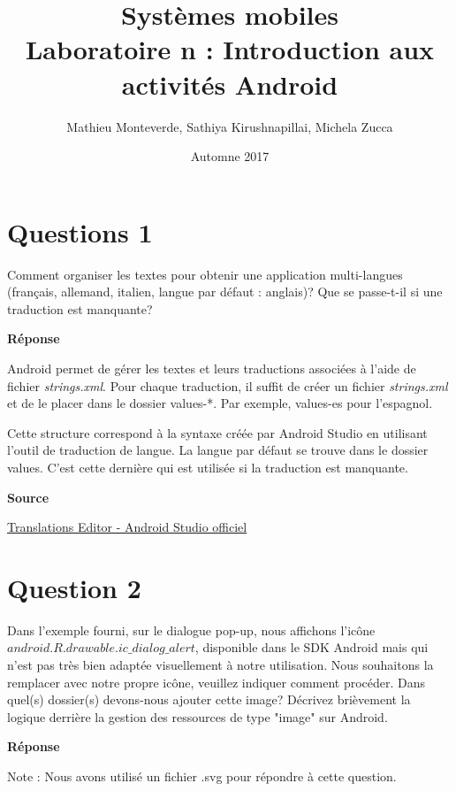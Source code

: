 \documentclass[francais,12pt]{article}
\title{Systèmes mobiles \\ Laboratoire n\textordmasculine1 : Introduction aux activités Android}
\author{Mathieu Monteverde, Sathiya Kirushnapillai, Michela Zucca}
\date{Automne 2017}
\begin{document}
	\maketitle
    
    \setlength{\parskip}{1em}
    
    \section*{Questions 1}

        Comment organiser les textes pour obtenir une application multi-langues (français, allemand, italien, langue par défaut : anglais)? Que se passe-t-il si une traduction est manquante? \par
        
        {\color[rgb]{0,0.5,0.23}\textbf{Réponse}}
        
        Android permet de gérer les textes et leurs traductions associées à l'aide de fichier \textit{strings.xml}. Pour chaque traduction, il suffit de créer un fichier \textit{strings.xml} et de le placer dans le dossier values-*. Par exemple, values-es pour l'espagnol.\par

        Cette structure correspond à la syntaxe créée par Android Studio en utilisant l'outil de traduction de langue. La langue par défaut se trouve dans le dossier values. C'est cette dernière qui est utilisée si la traduction est manquante.
        
        \textbf{Source}
        
        
        \href{https://developer.android.com/studio/write/translations-editor.html}{Translations Editor - Android Studio officiel}
        

	\section*{Question 2}
		Dans l'exemple fourni, sur le dialogue pop-up, nous affichons l'icône $android.R.drawable.ic\_dialog\_alert$, disponible dans le SDK Android mais qui n'est pas très bien adaptée visuellement à notre utilisation. Nous souhaitons la remplacer avec notre propre icône, veuillez indiquer comment procéder. Dans quel(s) dossier(s) devons-nous ajouter cette image? Décrivez brièvement la logique derrière la gestion des ressources de type "image" sur Android. 
		
		{\color[rgb]{0,0.5,0.23}\textbf{Réponse}}
		
		Note : Nous avons utilisé un fichier .svg pour répondre à cette question.
		
\end{document}
